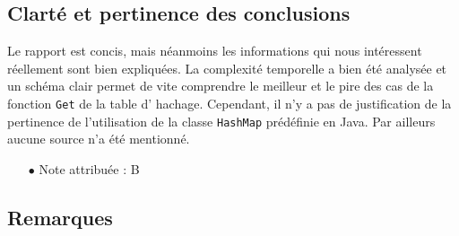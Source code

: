 \documentclass[11pt]{article}
\begin{document}
\subsection{Clarté et pertinence des conclusions}

Le rapport est concis, mais néanmoins les informations qui nous intéressent réellement sont bien expliquées. La complexité temporelle a bien été analysée et un schéma clair permet de vite comprendre le meilleur et le pire des cas de la fonction \verb+Get+ de la table d' hachage. Cependant, il n'y a pas de justification de la pertinence de l'utilisation de la classe \verb+HashMap+ prédéfinie en Java. Par ailleurs aucune source n'a été mentionné.
\\
\begin{itemize}
\item[$\bullet$] Note attribuée : B
\end{itemize}

  
\subsection{Remarques}
\end{document}
